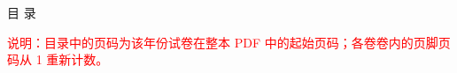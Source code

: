 \clearpage
{}
{}
\thispagestyle{empty}

\begin{center}
	\heiti 目 \quad 录
\end{center}

\vspace{1em}
\begingroup
	\makeatletter
	\makeatother
\endgroup

\vfil
\noindent
\textcolor{red}{说明：目录中的页码为该年份试卷在整本 PDF 中的起始页码；各卷卷内的页脚页码从 1 重新计数。}
\vfil
\thispagestyle{empty}
